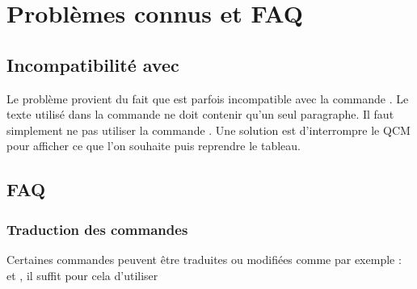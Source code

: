 \section{Problèmes connus et FAQ}

\subsection{Incompatibilité avec }

 Le problème provient du fait que  est parfois incompatible avec la commande . Le texte utilisé dans la commande  ne doit contenir qu'un seul paragraphe. 
 Il faut simplement ne pas utiliser la commande . Une solution est d'interrompre le QCM pour afficher ce que l'on souhaite puis reprendre le tableau.
 
 \subsection{FAQ}
  \subsubsection{Traduction des commandes}
  Certaines commandes peuvent être traduites ou modifiées comme par exemple :   et , il suffit pour cela d'utiliser  
  
\begin{tkzltxexample}[]
 \renewcommand{\aq@pre}{Pour chacune des questions ci-dessous, une seule des
  r\'eponses propos\'ees est exacte. Vous devez  cocher la r\'eponse exacte
   sans justification.
 Une bonne r\'eponse rapporte \textbf{\cmdAQ@global@bonus\ point}. Une
  mauvaise r\'eponse enl\`eve \textbf{\cmdAQ@global@malus\ point}.  L'absence
  de r\'eponse ne rapporte ni n'enl\`eve aucun point. Si le total des points
  est n\'egatif, la note globale attribu\'ee \`a l'exercice est \textbf{0}.}%
\end{tkzltxexample}

  
\endinput